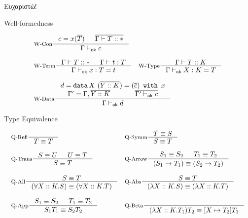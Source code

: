 \documentclass[10pt]{beamer}
\begin{document}
{
\begin{frame}[standout]
  Ευχαριστώ!
\end{frame}
}

\appendix


\begin{frame}{Well-formedness}
  \begin{minipage}[t]{10cm}
    \begin{displaymath}
    \begin{array}{ll}
    \inference[W-Con]{c = x(\seq{T}) & \seq{\Gamma |- T::\Type}}{\Gamma \provesok c} \\
    \\
    \inference[W-Term]{
      \Gamma |- T :: \Type &
      \Gamma |- t : T}{\Gamma \provesok x : T = t} &
    \inference[W-Type]{\Gamma |- T :: K}{\Gamma \provesok X : K = T}\\
    \\
    \multicolumn{2}{l}{\inference[W-Data]{
      d=\datatype{X}{(\seq{Y :: K})}{x}{(\seq{c})} \\
      \Gamma^\prime = \Gamma, \seq{Y::K} &
      \seq{\Gamma^\prime \provesok c}}{\Gamma \provesok d}}\\
    \end{array}
    \end{displaymath}
    \end{minipage}

\end{frame}

\begin{frame}{Type Equivalence}
      \begin{minipage}[t]{10cm}
    \centering
    \begin{displaymath}
    \begin{array}{ll}
    \inference[Q-Refl]{}{T \equiv T} &
    \inference[Q-Symm]{T \equiv S}{S \equiv T}  \\
    \\
    \inference[Q-Trans]{S \equiv U & U \equiv T}{S \equiv T} &
    \inference[Q-Arrow]{S_1 \equiv S_2 & T_1 \equiv T_2}{(S_1 -> T_1) \equiv (S_2 -> T_2)} \\
    \\
    \inference[Q-All]{S \equiv T}{(\forall X::K.S) \equiv (\forall X::K.T)} &
    \inference[Q-Abs]{S \equiv T}{(\lambda X::K.S) \equiv (\lambda X::K.T)} \\
    \\
    \inference[Q-App]{S_1 \equiv S_2 & T_1 \equiv T_2}{S_1 T_1 \equiv S_2 T_2} &
    \inference[Q-Beta]{}{(\lambda X::K.T_1)T_2 \equiv \subst{X}{T_2}{T_1}}
    \end{array}
    \end{displaymath}
    \end{minipage}

 \end{frame}
\end{document}
